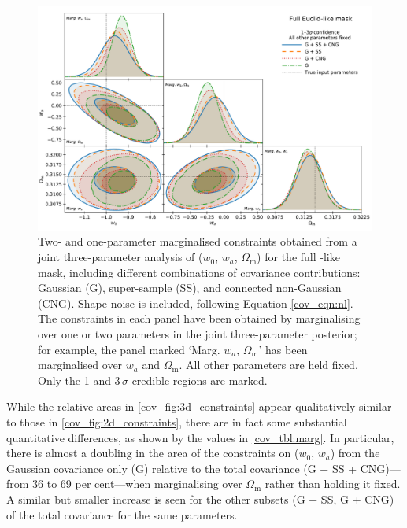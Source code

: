 \begin{figure} %
\includegraphics[width=\textwidth]{3d_constraints}
\caption{Two- and one-parameter marginalised constraints obtained from a joint three-parameter analysis of ($w_0$, $w_a$, $\Omega_\text{m}$) for the full \Euclid{}-like mask, including different combinations of covariance contributions: Gaussian (G), super-sample (SS), and connected non-Gaussian (CNG). Shape noise is included, following Equation \eqref{cov_eqn:nl}. The constraints in each panel have been obtained by marginalising over one or two parameters in the joint three-parameter posterior; for example, the panel marked `Marg. $w_a$, $\Omega_\text{m}$' has been marginalised over $w_a$ and $\Omega_\text{m}$. All other parameters are held fixed. Only the 1 and 3\,$\sigma$ credible regions are marked.}
\label{cov_fig:3d_constraints}
\end{figure}

While the relative areas in \autoref{cov_fig:3d_constraints} appear qualitatively similar to those in \autoref{cov_fig:2d_constraints}, there are in fact some substantial quantitative differences, as shown by the values in \autoref{cov_tbl:marg}. In particular, there is almost a doubling in the area of the constraints on ($w_0$, $w_a$) from the Gaussian covariance only (G) relative to the total covariance (G + SS + CNG)---from 36 to 69 per cent---when marginalising over $\Omega_\text{m}$ rather than holding it fixed. A similar but smaller increase is seen for the other subsets (G + SS, G + CNG) of the total covariance for the same parameters.

